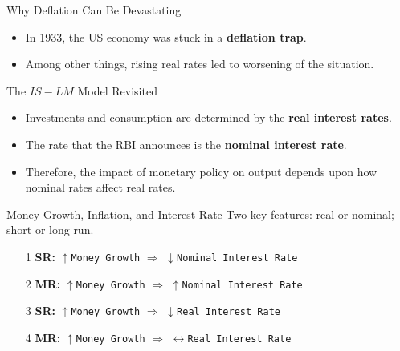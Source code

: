 \documentclass[shownotes,11pt, aspectratio=169]{beamer}
\begin{document}
\begin{frame}{Why Deflation Can Be Devastating}
\begin{itemize}
\item In 1933, the US economy was stuck in a \textbf{deflation trap}.
\item Among other things, rising real rates led to worsening of the situation.
\end{itemize}
\end{frame}

\begin{frame}{The $IS-LM$ Model Revisited}
\begin{itemize}
\item Investments and consumption are determined by the \textbf{real interest rates}.
\item The rate that the RBI announces is the \textbf{nominal interest rate}.
\item Therefore, the impact of monetary policy on output \pause depends upon how nominal rates affect real rates.
\end{itemize}
\end{frame}

\begin{frame}{Money Growth, Inflation, and Interest Rate}
Two key features: real or nominal; short or long run.
\begin{itemize}
\item[1] \textbf{SR:} $\uparrow$\texttt{Money Growth} $\Rightarrow$ $\downarrow$\texttt{Nominal Interest Rate} \pause
\item[2] \textbf{MR:} $\uparrow$\texttt{Money Growth} $\Rightarrow$ $\uparrow$\texttt{Nominal Interest Rate} \pause
\item[3] \textbf{SR:} $\uparrow$\texttt{Money Growth} $\Rightarrow$ $\downarrow$\texttt{Real Interest Rate} \pause
\item[4] \textbf{MR:} $\uparrow$\texttt{Money Growth} $\Rightarrow$ $\leftrightarrow$\texttt{Real Interest Rate}
\end{itemize}
\end{frame}
\end{document}
